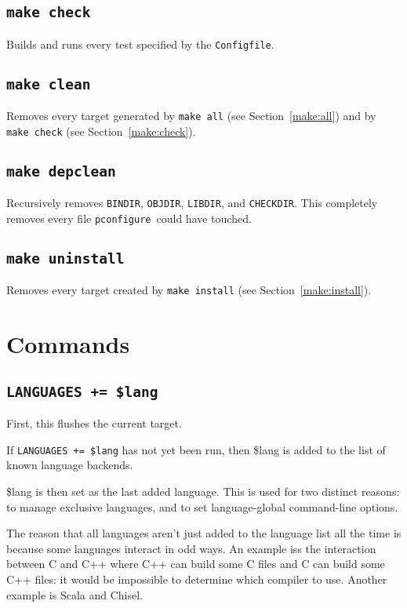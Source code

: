 \documentclass{article}
\newcommand{\pconfigure}{\texttt{pconfigure}}
\begin{document}
\subsection{\texttt{make check} \label{make:check}}

Builds and runs every test specified by the \texttt{Configfile}.

\subsection{\texttt{make clean}}

Removes every target generated by \texttt{make all} (see
Section~\ref{make:all}) and by \texttt{make check} (see
Section~\ref{make:check}).

\subsection{\texttt{make depclean}}

Recursively removes \texttt{BINDIR}, \texttt{OBJDIR}, \texttt{LIBDIR},
and \texttt{CHECKDIR}.  This completely removes every file
\pconfigure\ could have touched.

\subsection{\texttt{make uninstall}}

Removes every target created by \texttt{make install} (see
Section~\ref{make:install}).

\section{Commands \label{cmd}}

\subsection{\texttt{LANGUAGES += \$lang}}

First, this flushes the current target.

If \texttt{LANGUAGES += \$lang} has not yet been run, then \$lang is
added to the list of known language backends.

\$lang is then set as the last added language.  This is used for two
distinct reasons: to manage exclusive languages, and to set
language-global command-line options.

The reason that all languages aren't just added to the language list
all the time is because some languages interact in odd ways.  An
example iss the interaction between C and C++ where C++ can build some
C files and C can build some C++ files: it would be impossible to
determine which compiler to use.  Another example is Scala and Chisel.
\end{document}
